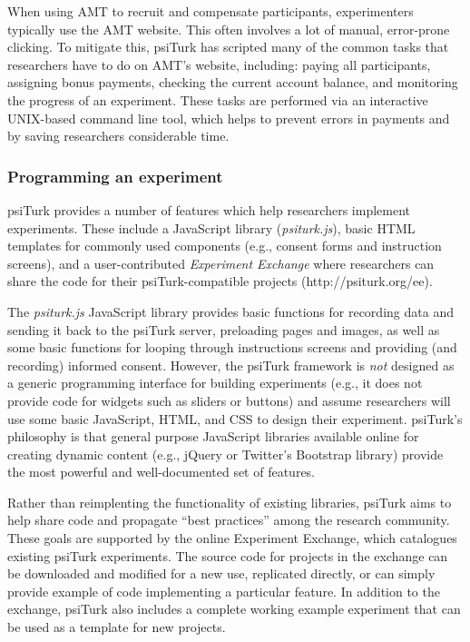 \documentclass[twocolumn]{svjour3}          %
\newcommand{\psiturk}[0]{\textsf{psiTurk}}
\newcommand{\psiturkjs}[0]{\emph{psiturk.js}}
\begin{document}
When using AMT to recruit and compensate participants,
experimenters typically use the AMT website.  This often
involves a lot of manual, error-prone clicking.  To mitigate this, \psiturk{}
has scripted many of the common
tasks that researchers have to do on AMT's website, including:
paying all participants, assigning bonus payments, checking the current
account balance, and monitoring the progress of an experiment.
These tasks are performed via an interactive UNIX-based command
line tool, which helps to prevent errors in payments and
by saving researchers considerable time.

\subsubsection{Programming an experiment}
\psiturk{} provides a number of features which help researchers implement 
experiments.  These include a JavaScript library (\psiturkjs{}), basic HTML templates 
for commonly used components (e.g., consent forms and instruction screens), 
and a user-contributed \emph{Experiment Exchange} where researchers can share the code for their \psiturk{}-compatible
projects (\textsf{http://psiturk.org/ee}). 

The \psiturkjs{} JavaScript library provides basic functions for recording data and sending it back to the \psiturk{} server,
preloading pages and images, as well as some basic functions for looping through instructions
screens and providing (and recording) informed consent.
However, the \psiturk{} framework is \emph{not} designed as a generic
programming interface for building 
experiments (e.g., it does not provide code for widgets such as sliders or buttons) and assume
researchers will use some basic JavaScript, HTML, and CSS to design their experiment.  \psiturk{}'s
philosophy is that general purpose JavaScript libraries available online for creating dynamic content (e.g., jQuery or
Twitter's Bootstrap library) provide the most powerful and well-documented set of features.  

Rather than reimplenting the functionality of existing libraries, \psiturk{} aims to help share code and propagate ``best practices'' among the research community.
These goals are supported by the online Experiment Exchange, which catalogues existing \psiturk{} experiments. The source code for projects in the exchange can be downloaded and modified for a new use,
replicated directly, or can simply provide example of code implementing a particular 
feature.  In addition to the exchange, \psiturk{} also includes a complete working example 
experiment that can be used as a template for new projects.
\end{document}
